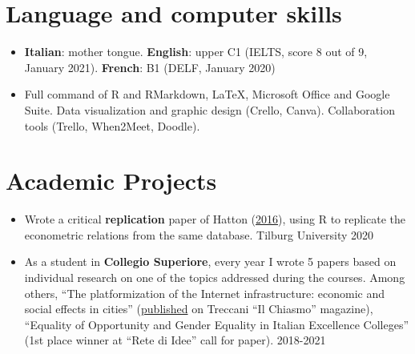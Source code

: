 \documentclass[10pt, a4paper]{extarticle}
\begin{document}
\hypertarget{language-and-computer-skills}{%
\section{Language and computer
skills}\label{language-and-computer-skills}}

\begin{itemize}
\item
  \textbf{Italian}: mother tongue. \textbf{English}: upper C1 (IELTS,
  score 8 out of 9, January 2021). \textbf{French}: B1 (DELF, January
  2020)
\item
  Full command of R and RMarkdown, LaTeX, Microsoft Office and Google
  Suite. Data visualization and graphic design (Crello, Canva).
  Collaboration tools (Trello, When2Meet, Doodle).
\end{itemize}

\hypertarget{academic-projects}{%
\section{Academic Projects}\label{academic-projects}}

\begin{itemize}
\item
  Wrote a critical \textbf{replication} paper of Hatton
  (\href{https://www.aeaweb.org/articles?id=10.1257/aer.p20161062}{2016}),
  using R to replicate the econometric relations from the same database.
  Tilburg University \textbar{} 2020
\item
  As a student in \textbf{Collegio Superiore}, every year I wrote 5
  papers based on individual research on one of the topics addressed
  during the courses. Among others, ``The platformization of the
  Internet infrastructure: economic and social effects in cities''
  (\href{https://www.treccani.it/magazine/chiasmo/scienze_naturali_e_tecnologia/Pubblico_vs_privato/CSB_van_Veen_e_Frick_Piattaforme_e_servizi_Internet_nello_spazio_urbano_contemporaneo_seconda_parte.html}{published}
  on Treccani ``Il Chiasmo'' magazine), ``Equality of Opportunity and
  Gender Equality in Italian Excellence Colleges'' (1st place winner at
  ``Rete di Idee'' call for paper). \textbar{} 2018-2021
\end{itemize}
\end{document}
